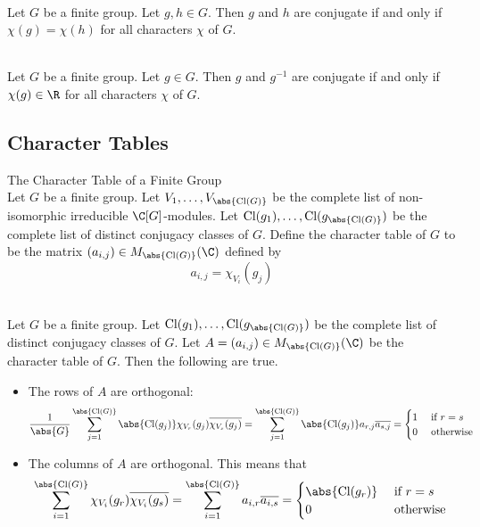 \documentclass[a4paper]{article}
\begin{document}
\begin{crl}{}{}\\
Let $G$ be a finite group. Let $g,h\in G$. Then $g$ and $h$ are conjugate if and only if $\chi(g)=\chi(h)$ for all characters $\chi$ of $G$. 
\end{crl}

\begin{crl}{}{}\\
Let $G$ be a finite group. Let $g\in G$. Then $g$ and $g^{-1}$ are conjugate if and only if $\chi(g)\in\R$ for all characters $\chi$ of $G$. 
\end{crl}

\subsection{Character Tables}
\begin{defn}{The Character Table of a Finite Group}{}\\
Let $G$ be a finite group. Let $V_1,\dots,V_{\abs{\text{Cl}(G)}}$ be the complete list of non-isomorphic irreducible $\C[G]$-modules. Let $\text{Cl}(g_1),\dots,\text{Cl}(g_{\abs{\text{Cl}(G)}})$ be the complete list of distinct conjugacy classes of $G$. Define the character table of $G$ to be the matrix $(a_{i,j})\in M_{\abs{\text{Cl}(G)}}(\C)$ defined by $$a_{i,j}=\chi_{V_i}(g_j)$$
\end{defn}

\begin{prp}{}{}\\
Let $G$ be a finite group. Let $\text{Cl}(g_1),\dots,\text{Cl}(g_{\abs{\text{Cl}(G)}})$ be the complete list of distinct conjugacy classes of $G$. Let $A=(a_{i,j})\in M_{\abs{\text{Cl}(G)}}(\C)$ be the character table of $G$. Then the following are true. 
\begin{itemize}
\item The rows of $A$ are orthogonal: $$\frac{1}{\abs{G}}\sum_{j=1}^\abs{\text{Cl}(G)}\abs{\text{Cl}(g_j)}\chi_{V_r}(g_j)\overline{\chi_{V_s}(g_j)}=\sum_{j=1}^\abs{\text{Cl}(G)}\abs{\text{Cl}(g_j)}a_{r,j}\overline{a_{s,j}}=\begin{cases}
1 & \text{ if }r=s\\
0 & \text{ otherwise }
\end{cases}$$
\item The columns of $A$ are orthogonal. This means that $$\sum_{i=1}^\abs{\text{Cl}(G)}\chi_{V_i}(g_r)\overline{\chi_{V_i}(g_s)}=\sum_{i=1}^\abs{\text{Cl}(G)}a_{i,r}\overline{a_{i,s}}=\begin{cases}
\abs{\text{Cl}(g_r)} & \text{ if }r=s\\
0 & \text{ otherwise }
\end{cases}$$
\end{itemize}
\end{prp}
\end{document}
